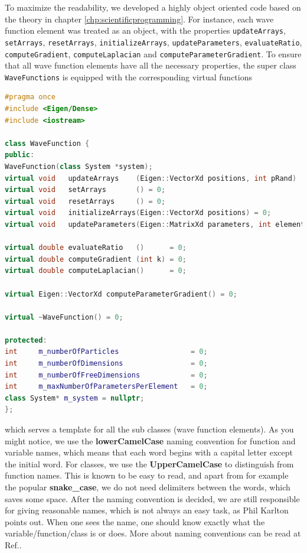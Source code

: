To maximize the readability, we developed a highly object oriented code based on the theory in chapter \eqref{chp:scientificprogramming}. For instance, each wave function element was treated as an object, with the properties \lstinline{updateArrays}, \lstinline{setArrays}, \lstinline{resetArrays}, \lstinline{initializeArrays}, \lstinline{updateParameters}, \lstinline{evaluateRatio}, \lstinline{computeGradient}, \lstinline{computeLaplacian} and \newline\lstinline{computeParameterGradient}. To ensure that all wave function elements have all the necessary properties, the super class \lstinline{WaveFunctions} is equipped with the corresponding virtual functions
\lstset{basicstyle=\scriptsize}
\begin{lstlisting}[language=c++,caption={\lstinline{wavefunction.h}}]
#pragma once
#include <Eigen/Dense>
#include <iostream>

class WaveFunction {
public:
WaveFunction(class System *system);
virtual void   updateArrays    (Eigen::VectorXd positions, int pRand)  = 0;
virtual void   setArrays       () = 0;
virtual void   resetArrays     () = 0;
virtual void   initializeArrays(Eigen::VectorXd positions) = 0;
virtual void   updateParameters(Eigen::MatrixXd parameters, int elementNumber) = 0;

virtual double evaluateRatio   ()      = 0;
virtual double computeGradient (int k) = 0;
virtual double computeLaplacian()      = 0;

virtual Eigen::VectorXd computeParameterGradient() = 0;

virtual ~WaveFunction() = 0;

protected:
int     m_numberOfParticles                 = 0;
int     m_numberOfDimensions                = 0;
int     m_numberOfFreeDimensions            = 0;
int     m_maxNumberOfParametersPerElement   = 0;
class System* m_system = nullptr;
};
\end{lstlisting}
which serves a template for all the sub classes (wave function elements). As you might notice, we use the \textbf{lowerCamelCase} naming convention for function and variable names, which means that each word begins with a capital letter except the initial word. For classes, we use the \textbf{UpperCamelCase} to distinguish from function names. This is known to be easy to read, and apart from for example the popular \textbf{snake\_case}, we do not need delimiters between the words, which saves some space. After the naming convention is decided, we are still responsible for giving reasonable names, which is not always an easy task, as Phil Karlton points out. When one sees the name, one should know exactly what the variable/function/class is or does. More about naming conventions can be read at Ref.\cite{noauthor_naming_2019}.

